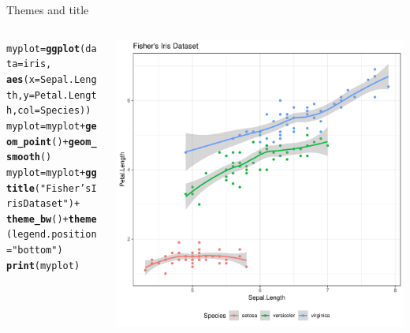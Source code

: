 \documentclass[aspectratio=169]{beamer}\usepackage[]{graphicx}\usepackage[]{color}
\makeatletter
\def\maxwidth{ %
  \ifdim\Gin@nat@width>\linewidth
    \linewidth
  \else
    \Gin@nat@width
  \fi
}
\newcommand{\hlstr}[1]{\textcolor[rgb]{0.192,0.494,0.8}{#1}}%
\newcommand{\hlopt}[1]{\textcolor[rgb]{0,0,0}{#1}}%
\newcommand{\hlstd}[1]{\textcolor[rgb]{0.345,0.345,0.345}{#1}}%
\newcommand{\hlkwb}[1]{\textcolor[rgb]{0.69,0.353,0.396}{#1}}%
\newcommand{\hlkwc}[1]{\textcolor[rgb]{0.333,0.667,0.333}{#1}}%
\newcommand{\hlkwd}[1]{\textcolor[rgb]{0.737,0.353,0.396}{\textbf{#1}}}%
\newenvironment{kframe}{%
 \def\at@end@of@kframe{}%
 \ifinner\ifhmode%
  \def\at@end@of@kframe{\end{minipage}}%
  \begin{minipage}{\columnwidth}%
 \fi\fi%
 \def\FrameCommand##1{\hskip\@totalleftmargin \hskip-\fboxsep
 \colorbox{shadecolor}{##1}\hskip-\fboxsep
     \hskip-\linewidth \hskip-\@totalleftmargin \hskip\columnwidth}%
 \MakeFramed {\advance\hsize-\width
   \@totalleftmargin\z@ \linewidth\hsize
   \@setminipage}}%
 {\par\unskip\endMakeFramed%
 \at@end@of@kframe}
\newenvironment{knitrout}{}{} %
\makeatother
\begin{document}
\begin{frame}[fragile]{Themes and title}
\begin{columns}
  \begin{column}{0.50\textwidth}
\begin{knitrout}\tiny
{}\color{fgcolor}\begin{kframe}
\begin{alltt}
\hlstd{myplot} \hlkwb{=} \hlkwd{ggplot}\hlstd{(}\hlkwc{data}\hlstd{=iris,}
                \hlkwd{aes}\hlstd{(}\hlkwc{x}\hlstd{=Sepal.Length,} \hlkwc{y}\hlstd{=Petal.Length,} \hlkwc{col}\hlstd{=Species))}
\hlstd{myplot} \hlkwb{=} \hlstd{myplot} \hlopt{+} \hlkwd{geom_point}\hlstd{()} \hlopt{+} \hlkwd{geom_smooth}\hlstd{()}
\hlstd{myplot} \hlkwb{=} \hlstd{myplot} \hlopt{+} \hlkwd{ggtitle}\hlstd{(}\hlstr{"Fisher's Iris Dataset"}\hlstd{)} \hlopt{+}
  \hlkwd{theme_bw}\hlstd{()} \hlopt{+} \hlkwd{theme}\hlstd{(}\hlkwc{legend.position}\hlstd{=}\hlstr{"bottom"}\hlstd{)}
\hlkwd{print}\hlstd{(myplot)}
\end{alltt}
\end{kframe}
\end{knitrout}
  \end{column}
  \begin{column}{0.5\textwidth}
\begin{knitrout}\scriptsize
{}\color{fgcolor}
\includegraphics[width=\maxwidth]{figure/unnamed-chunk-13-1} 

\end{knitrout}
  \end{column}
\end{columns}
\end{frame}
\end{document}
